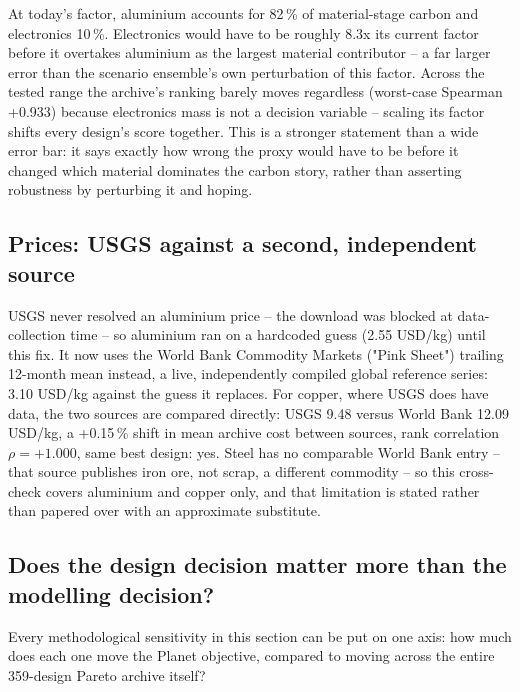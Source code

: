 \documentclass[11pt,a4paper]{article}
\begin{document}
At today's factor, aluminium accounts for 82\,\% of material-stage
carbon and electronics 10\,\%. Electronics would have to be roughly 8.3x its current factor before it overtakes aluminium as the largest material contributor -- a far larger error than the scenario ensemble's own perturbation of this factor. Across the tested range the archive's ranking barely moves regardless (worst-case Spearman +0.933) because electronics mass is not a decision variable -- scaling its factor shifts every design's score together.
This is a stronger statement than a wide error bar: it says exactly how wrong
the proxy would have to be before it changed which material dominates the
carbon story, rather than asserting robustness by perturbing it and hoping.

\subsection{Prices: USGS against a second, independent source}

USGS never resolved an aluminium price -- the download was blocked at
data-collection time -- so aluminium ran on a hardcoded guess
(\SI{2.55}{} USD/kg) until this fix. It now uses the World Bank Commodity
Markets ("Pink Sheet") trailing 12-month mean instead, a live, independently
compiled global reference series: \SI{3.10}{} USD/kg against the
guess it replaces. For copper, where USGS does have data, the two sources are
compared directly: USGS \SI{9.48}{} versus World Bank
\SI{12.09}{} USD/kg, a +0.15\,\% shift in mean archive
cost between sources, rank correlation $\rho=+1.000$, same best design:
yes. Steel has no comparable World Bank entry -- that source
publishes iron ore, not scrap, a different commodity -- so this cross-check
covers aluminium and copper only, and that limitation is stated rather than
papered over with an approximate substitute.

\subsection{Does the design decision matter more than the modelling decision?}

Every methodological sensitivity in this section can be put on one axis: how
much does each one move the Planet objective, compared to moving across the
entire 359-design Pareto archive itself?
\end{document}
